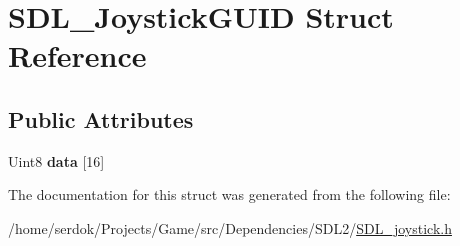 \hypertarget{structSDL__JoystickGUID}{}\section{S\+D\+L\+\_\+\+Joystick\+G\+U\+ID Struct Reference}
\label{structSDL__JoystickGUID}
\subsection*{Public Attributes}
\begin{DoxyCompactItemize}
\item 
\mbox{\label{structSDL__JoystickGUID_a16935b928a608fe98e0509f242590597}} 
Uint8 {\bfseries data} \mbox{[}16\mbox{]}
\end{DoxyCompactItemize}


The documentation for this struct was generated from the following file\+:\begin{DoxyCompactItemize}
\item 
/home/serdok/\+Projects/\+Game/src/\+Dependencies/\+S\+D\+L2/\hyperlink{SDL__joystick_8h}{S\+D\+L\+\_\+joystick.\+h}\end{DoxyCompactItemize}

